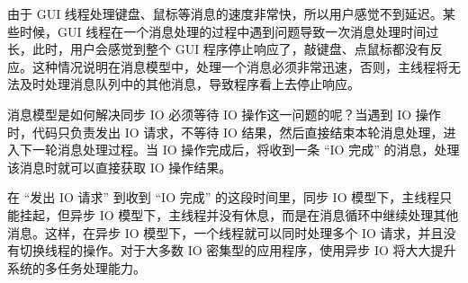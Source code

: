 由于 GUI
线程处理键盘、鼠标等消息的速度非常快，所以用户感觉不到延迟。某些时候，GUI
线程在一个消息处理的过程中遇到问题导致一次消息处理时间过长，此时，用户会感觉到整个
GUI
程序停止响应了，敲键盘、点鼠标都没有反应。这种情况说明在消息模型中，处理一个消息必须非常迅速，否则，主线程将无法及时处理消息队列中的其他消息，导致程序看上去停止响应。

消息模型是如何解决同步 IO 必须等待 IO 操作这一问题的呢？当遇到 IO
操作时，代码只负责发出 IO 请求，不等待 IO
结果，然后直接结束本轮消息处理，进入下一轮消息处理过程。当 IO
操作完成后，将收到一条 ``IO 完成'' 的消息，处理该消息时就可以直接获取 IO
操作结果。

在 ``发出 IO 请求'' 到收到 ``IO 完成'' 的这段时间里，同步 IO
模型下，主线程只能挂起，但异步 IO
模型下，主线程并没有休息，而是在消息循环中继续处理其他消息。这样，在异步
IO 模型下，一个线程就可以同时处理多个 IO
请求，并且没有切换线程的操作。对于大多数 IO 密集型的应用程序，使用异步
IO 将大大提升系统的多任务处理能力。

